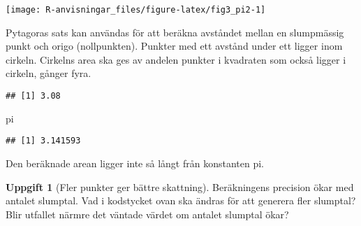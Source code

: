 \documentclass[
]{book}
\newenvironment{Shaded}{\begin{snugshade}}{\end{snugshade}}
\newcommand{\AttributeTok}[1]{\textcolor[rgb]{0.13,0.29,0.53}{#1}}
\newcommand{\DecValTok}[1]{\textcolor[rgb]{0.00,0.00,0.81}{#1}}
\newcommand{\FunctionTok}[1]{\textcolor[rgb]{0.13,0.29,0.53}{\textbf{#1}}}
\newcommand{\NormalTok}[1]{#1}
\newcommand{\OtherTok}[1]{\textcolor[rgb]{0.56,0.35,0.01}{#1}}
\newcommand{\SpecialCharTok}[1]{\textcolor[rgb]{0.81,0.36,0.00}{\textbf{#1}}}
\theoremstyle{definition}
\theoremstyle{definition}
\theoremstyle{definition}
\newtheorem{exercise}{Uppgift}[chapter]
\theoremstyle{definition}
\theoremstyle{remark}
\begin{document}
\begin{center}\texttt{[image: R-anvisningar\_files/figure-latex/fig3\_pi2-1]} \end{center}

Pytagoras sats kan användas för att beräkna avståndet mellan en slumpmässig punkt och origo (nollpunkten). Punkter med ett avstånd under ett ligger inom cirkeln. Cirkelns area ska ges av andelen punkter i kvadraten som också ligger i cirkeln, gånger fyra.

\begin{Shaded}
\end{Shaded}

\begin{verbatim}
## [1] 3.08
\end{verbatim}

\begin{Shaded}
\begin{Highlighting}[]
\NormalTok{pi}
\end{Highlighting}
\end{Shaded}

\begin{verbatim}
## [1] 3.141593
\end{verbatim}

Den beräknade arean ligger inte så långt från konstanten pi.

\begin{exercise}[Fler punkter ger bättre skattning]
Beräkningens precision ökar med antalet slumptal. Vad i kodstycket ovan ska ändras för att generera fler slumptal? Blir utfallet närmre det väntade värdet om antalet slumptal ökar?
\end{exercise}
\end{document}
